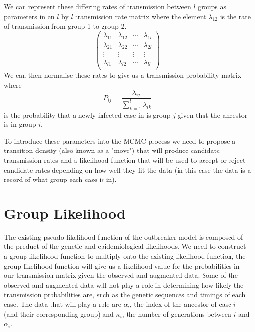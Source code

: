 \documentclass{amsbook}
\begin{document}
We can represent these differing rates of transmission between $l$ groups as parameters in an $l$ by $l$ transmission rate matrix where the element $\lambda_{12}$ is the rate of transmission from group 1 to group 2.
\[ \left( \begin{array}{cccc}
\lambda_{11} & \lambda_{12} & \cdots & \lambda_{1l} \\
\lambda_{21} & \lambda_{22} & \cdots & \lambda_{2l} \\
\vdots & \vdots & \vdots & \vdots \\
\lambda_{l1} & \lambda_{l2} & \cdots & \lambda_{ll} \\
\end{array} \right) \] 
We can then normalise these rates to give us a transmission probability matrix where \[P_{ij} = \frac{\lambda_{ij}}{\sum^{l}_{k=1}\lambda_{ik}} \]
is the probability that a newly infected case in is group $j$ given that the ancestor is in group $i$.

To introduce these parameters into the MCMC process we need to propose a transition density (also known as a "move") that will produce candidate transmission rates and a likelihood function that will be used to accept or reject candidate rates depending on how well they fit the data (in this case the data is a record of what group each case is in).

\section{Group Likelihood}
The existing pseudo-likelihood function of the outbreaker model is composed of the product of the genetic and epidemiological likelihoods. We need to construct a group likelihood function to multiply onto the existing likelihood function, the group likelihood function will give us a likelihood value for the probabilities in our transmission matrix given the observed and augmented data. Some of the observed and augmented data will not play a role in determining how likely the transmission probabilities are, such as the genetic sequences and timings of each case. The data that will play a role are $\alpha_i$, the index of the ancestor of case $i$ (and their corresponding group) and $\kappa_i$, the number of generations between $i$ and $\alpha_i$.\\
\end{document}
